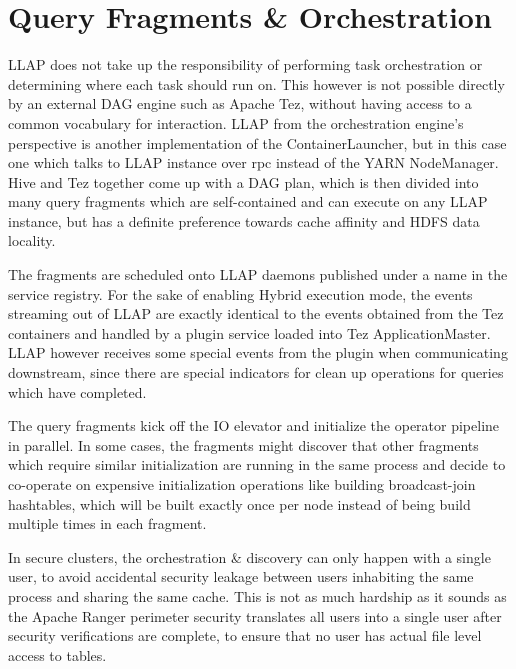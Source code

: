 \section{Query Fragments \& Orchestration}

LLAP does not take up the responsibility of performing task orchestration or determining where each task should run on. 
This however is not possible directly by an external DAG engine such as Apache Tez\cite{tez}, without having access to
a common vocabulary for interaction. LLAP from the orchestration engine's perspective is another implementation of the
ContainerLauncher, but in this case one which talks to LLAP instance over rpc instead of the YARN NodeManager. Hive and
Tez together come up with a DAG plan, which is then divided into many query fragments which are self-contained and can 
execute on any LLAP instance, but has a definite preference towards cache affinity and HDFS data locality.

The fragments are scheduled onto LLAP daemons published under a name in the service registry. For the sake of enabling 
Hybrid execution mode, the events streaming out of LLAP are exactly identical to the events obtained from the Tez containers
and handled by a plugin service loaded into Tez ApplicationMaster. LLAP however receives some special events from the
plugin when communicating downstream, since there are special indicators for clean up operations for queries which have
completed.

The query fragments kick off the IO elevator and initialize the operator pipeline in parallel. In some cases, the fragments
might discover that other fragments which require similar initialization are running in the same process and decide to 
co-operate on expensive initialization operations like building broadcast-join hashtables, which will be built exactly once
per node instead of being build multiple times in each fragment.


In secure clusters, the orchestration \& discovery can only happen with a single user, to avoid accidental security leakage
between users inhabiting the same process and sharing the same cache. This is not as much hardship as it sounds as the 
Apache Ranger\cite{ranger} perimeter security translates all users into a single user after security verifications are 
complete, to ensure that no user has actual file level access to tables.

